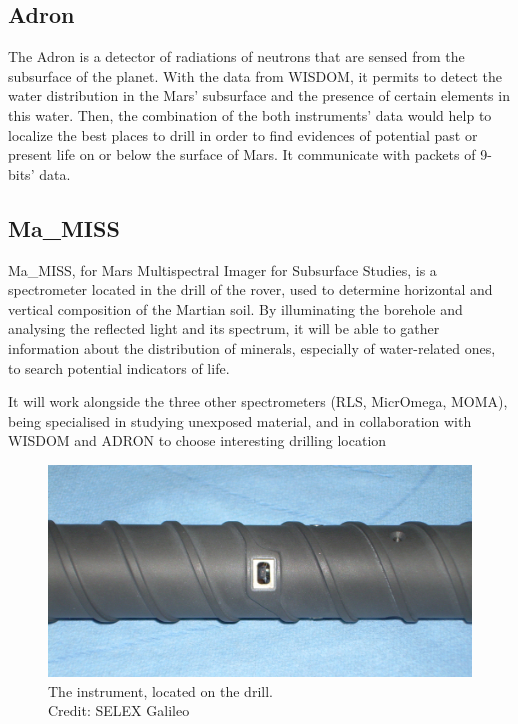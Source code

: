\documentclass[12pt,a4paper]{article}
\begin{document}
\subsection{Adron}

The Adron is a detector of radiations of neutrons that are sensed from the subsurface of the planet. With the data from WISDOM, it permits to detect the water distribution in the Mars' subsurface and the presence of certain elements in this water. Then, the combination of the both instruments' data would help to localize the best places to drill in order to find evidences of potential past or present life on or below the surface of Mars. It communicate with packets of 9-bits' data.

\subsection{Ma\_MISS}
Ma\_MISS, for Mars Multispectral Imager for Subsurface Studies, is a spectrometer located in the drill of the rover, used to determine horizontal and vertical composition of the Martian soil. By illuminating the borehole and analysing the reflected light and its spectrum, it will be able to gather information about the distribution of minerals, especially of water-related ones, to search potential indicators of life.

It will work alongside the three other spectrometers (RLS, MicrOmega, MOMA), being specialised in studying unexposed material, and in collaboration with WISDOM and ADRON to choose interesting drilling location

\begin{figure}[h]
\centering
\includegraphics[scale=.7]{pictures/MaMiss}
\caption{The instrument, located on the drill.\\Credit: SELEX Galileo}
\end{figure}
\end{document}
